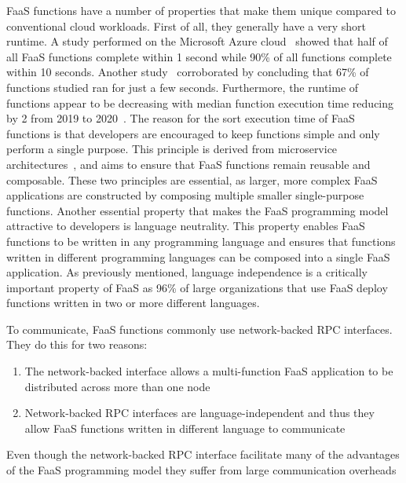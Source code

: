 \documentclass[../main.tex]{subfiles}
\begin{document}
\begin{refsection}
FaaS functions have a number of properties that make them unique
compared to conventional cloud workloads. First of all, they generally
have a very short runtime. A study performed on the Microsoft Azure
cloud~\cite{shahrad20_server_wild} showed that half of all FaaS
functions complete within 1 second while 90\% of all functions
complete within 10 seconds. Another
study~\cite{eismann20_review_server_use_cases_their_charac}
corroborated by concluding that 67\% of functions studied ran for just
a few seconds.  Furthermore, the runtime of functions appear to be
decreasing with median function execution time reducing by
2\texttimes{} from 2019 to 2020~\cite{serverless_state_21}. The reason
for the sort execution time of FaaS functions is that developers are
encouraged to keep functions simple and only perform a single
purpose. This principle is derived from microservice
architectures~\cite{gan19_open_sourc_bench_suite_micros}, and aims to
ensure that FaaS functions remain reusable and composable. These two
principles are essential, as larger, more complex FaaS applications
are constructed by composing multiple smaller single-purpose
functions. Another essential property that makes the FaaS programming
model attractive to developers is language neutrality. This property
enables FaaS functions to be written in any programming language and
ensures that functions written in different programming languages can
be composed into a single FaaS application. As previously mentioned,
language independence is a critically important property of FaaS as
96\% of large organizations that use FaaS deploy functions written in
two or more different languages\cite{serverless_state}.

To communicate, FaaS functions commonly use network-backed RPC interfaces. They do this for two reasons:

\begin{enumerate}
\item The network-backed interface allows a multi-function FaaS application to be distributed across more than one node
\item Network-backed RPC interfaces are language-independent and thus they allow FaaS functions written in different language to communicate
\end{enumerate}

Even though the network-backed RPC interface facilitate many of the
advantages of the FaaS programming model they suffer from large communication overheads 



\end{refsection}
\end{document}
